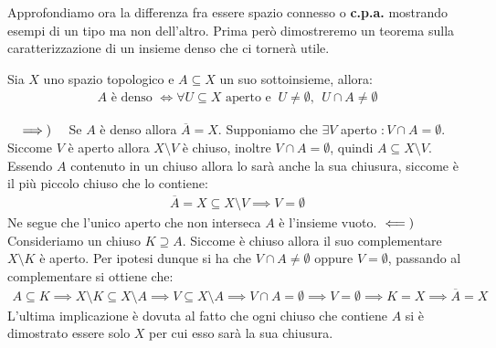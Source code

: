 Approfondiamo ora la differenza fra essere spazio connesso o \textbf{c.p.a.} mostrando esempi di un tipo ma non dell'altro. Prima però dimostreremo un teorema sulla caratterizzazione di un insieme denso che ci tornerà utile.
\begin{theorema}
	Sia $X$ uno spazio topologico e $A\subseteq X$ un suo sottoinsieme, allora:
		\begin{gather*}
			A \text{ è denso }\iff \forall U\subseteq X \text{ aperto e } \ U\neq\emptyset, \ \ U\cap A\neq\emptyset	
		\end{gather*}
\end{theorema}
\begin{demonstration}~{}
	$\implies)\quad$ Se $A$ è denso allora $\overline{A}=X$. Supponiamo che $\exists V$ aperto $\colon V\cap A=\emptyset$. Siccome $V$ è aperto allora $X\setminus V$ è chiuso, inoltre $V\cap A=\emptyset$, quindi $A\subseteq X\setminus V$. Essendo $A$ contenuto in un chiuso allora lo sarà anche la sua chiusura, siccome è il più piccolo chiuso che lo contiene:
		\begin{gather*}
			\overline{A}=X\subseteq X\setminus V \implies V=\emptyset
		\end{gather*}
	Ne segue che l'unico aperto che non interseca $A$ è l'insieme vuoto. \newline 
	$\impliedby)\quad$ Consideriamo un chiuso $K\supseteq A$. Siccome è chiuso allora il suo complementare $X\setminus K$ è aperto. Per ipotesi dunque si ha che $V\cap A\neq \emptyset$ oppure $V=\emptyset$, passando al complementare si ottiene che:
		\begin{gather*}
			A\subseteq K \implies X\setminus K \subseteq X\setminus A \implies V\subseteq X\setminus A \implies V\cap A=\emptyset \implies V=\emptyset \implies K=X \implies \overline{A}=X
		\end{gather*}
	L'ultima implicazione è dovuta al fatto che ogni chiuso che contiene $A$ si è dimostrato essere solo $X$ per cui esso sarà la sua chiusura.
\end{demonstration}

